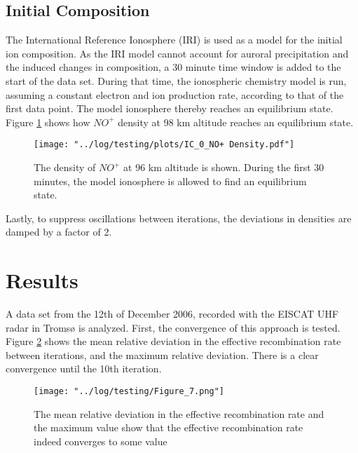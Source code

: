 \documentclass[10pt, a4paper]{article}
\numberwithin{equation}{section}										%
\begin{document}
\subsection{Initial Composition}
The International Reference Ionosphere (IRI) \cite{bilitza_international_2014} is used as a model for the initial ion composition. As the IRI model cannot account for auroral precipitation and the induced changes in composition, a 30 minute time window is added to the start of the data set. During that time, the ionospheric chemistry model is run, assuming a constant electron and ion production rate, according to that of the first data point. The model ionosphere thereby reaches an equilibrium state. Figure \ref{fig:dialin} shows how $NO^+$ density at 98 km altitude reaches an equilibrium state.


\begin{figure}
	\centering
	\texttt{[image: "../log/testing/plots/IC\_0\_NO+ Density.pdf"]}
	\caption{The density of $NO^+$ at 96 km altitude is shown. During the first 30 minutes, the model ionosphere is allowed to find an equilibrium state.}
	\label{fig:dialin}
\end{figure}
%

Lastly, to suppress oscillations between iterations, the deviations in densities are damped by a factor of 2.


\section{Results}
A data set from the 12th of December 2006, recorded with the EISCAT UHF radar in Tromsø is analyzed. First, the convergence of this approach is tested. Figure \ref{fig:convergence} shows the mean relative deviation in the effective recombination rate between iterations, and the maximum relative deviation. There is a clear convergence until the 10th iteration. 

\begin{figure}
	\centering
	\texttt{[image: "../log/testing/Figure\_7.png"]}
	\caption{The mean relative deviation in the effective recombination rate and the maximum value show that the effective recombination rate indeed converges to some value}
	\label{fig:convergence}
\end{figure}
%
\par\medskip
%
\end{document}
